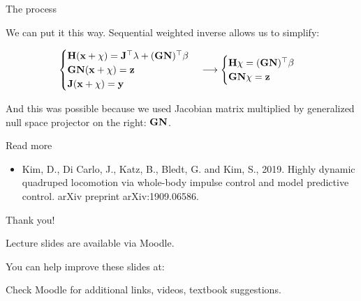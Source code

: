 \documentclass{beamer}
\begin{document}
\begin{frame}{The process}
	\begin{flushleft}
		
		We can put it this way. Sequential weighted inverse allows us to simplify:
		
		$$
		\begin{cases}
			\mathbf{H} (\mathbf{x} + \chi) = \mathbf{J}^\top \lambda + (\mathbf{G}\mathbf{N})^\top \beta\\
			\mathbf{G}\mathbf{N} (\mathbf{x} + \chi) = \mathbf{z} \\
			\mathbf{J} (\mathbf{x} + \chi) = \mathbf{y}
		\end{cases}
		\longrightarrow
		\begin{cases}
			\mathbf{H} \chi = (\mathbf{G}\mathbf{N})^\top \beta\\
			\mathbf{G}\mathbf{N} \chi = \mathbf{z}
		\end{cases}
		$$
		
		And this was possible because we used Jacobian matrix multiplied by generalized null space projector on the right: $\mathbf{G}\mathbf{N}$.
		
		
	\end{flushleft}
\end{frame}




\begin{frame}{Read more}
	\begin{flushleft}
		
		
		\begin{itemize}
			\item Kim, D., Di Carlo, J., Katz, B., Bledt, G. and Kim, S., 2019. Highly dynamic quadruped locomotion via whole-body impulse control and model predictive control. arXiv preprint arXiv:1909.06586.
		\end{itemize}
		
		
	\end{flushleft}
\end{frame}



\begin{frame}{Thank you!}
\centerline{Lecture slides are available via Moodle.}
\bigskip
\centerline{You can help improve these slides at:}
\centerline{\mygit}
\bigskip
\centerline{Check Moodle for additional links, videos, textbook suggestions.}
\bigskip

\centerline{\textcolor{black}{}}

\end{frame}
\end{document}
